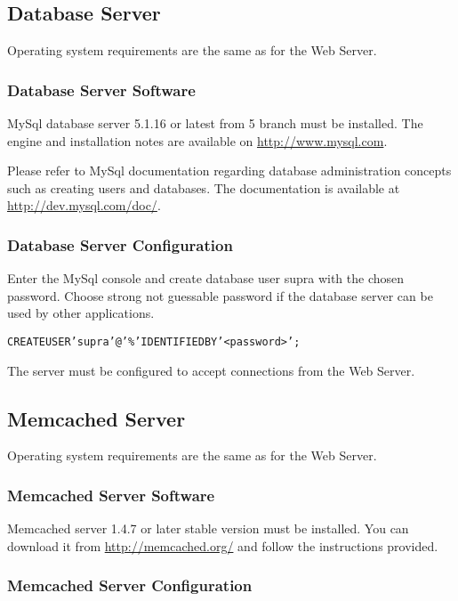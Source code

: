\documentclass[12pt]{article}
\begin{document}
\subsection{Database Server}
Operating system requirements are the same as for the Web Server.

\subsubsection{Database Server Software}

MySql database server 5.1.16 or latest from 5 branch must be installed. The engine and installation notes are available on \url{http://www.mysql.com}.

Please refer to MySql documentation regarding database administration concepts such as creating users and databases. The documentation is available at \url{http://dev.mysql.com/doc/}.

\subsubsection{Database Server Configuration}

Enter the MySql console and create database user \textsf{supra} with the chosen password. Choose strong not guessable password if the database server can be used by other applications.

\begin{alltt}
CREATE USER 'supra'@'\%' IDENTIFIED BY '<password>';
\end{alltt}

The server must be configured to accept connections from the Web Server.

\subsection{Memcached Server}
Operating system requirements are the same as for the Web Server.

\subsubsection{Memcached Server Software}

Memcached server 1.4.7 or later stable version must be installed. You can download it from \url{http://memcached.org/} and follow the instructions provided.

\subsubsection{Memcached Server Configuration}
\end{document}
